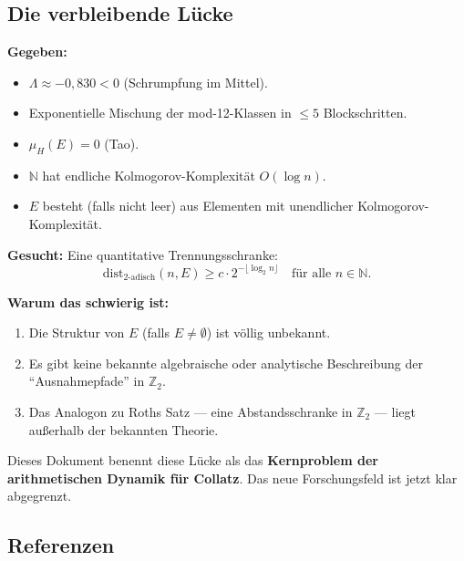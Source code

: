 \documentclass[12pt,a4paper]{article}
\newcommand{\N}{\mathbb{N}}
\newcommand{\Ztwo}{\mathbb{Z}_2}
\begin{document}
\subsection{Die verbleibende Lücke}

\begin{tcolorbox}[lücke, title={Die einzige verbleibende Lücke}]
\textbf{Gegeben:}
\begin{itemize}[nosep]
  \item $\Lambda \approx -0{,}830 < 0$ (Schrumpfung im Mittel).
  \item Exponentielle Mischung der mod-12-Klassen in $\leq 5$ Blockschritten.
  \item $\mu_H(E) = 0$ (Tao).
  \item $\N$ hat endliche Kolmogorov-Komplexität $O(\log n)$.
  \item $E$ besteht (falls nicht leer) aus Elementen mit unendlicher
    Kolmogorov-Komplexität.
\end{itemize}

\medskip
\textbf{Gesucht:} Eine quantitative Trennungsschranke:
\[
  \mathrm{dist}_{2\text{-adisch}}(n, E) \geq c \cdot 2^{-\lfloor\log_2 n\rfloor}
  \quad \text{für alle } n \in \N.
\]

\medskip
\textbf{Warum das schwierig ist:}
\begin{enumerate}[label=(\arabic*), nosep]
  \item Die Struktur von $E$ (falls $E \neq \emptyset$) ist völlig unbekannt.
  \item Es gibt keine bekannte algebraische oder analytische Beschreibung
    der ``Ausnahmepfade'' in $\Ztwo$.
  \item Das Analogon zu Roths Satz --- eine Abstandsschranke in $\Ztwo$ ---
    liegt außerhalb der bekannten Theorie.
\end{enumerate}

\medskip
Dieses Dokument benennt diese Lücke als das \textbf{Kernproblem der
arithmetischen Dynamik für Collatz}. Das neue Forschungsfeld ist jetzt
klar abgegrenzt.
\end{tcolorbox}

\subsection{Referenzen}
\end{document}
